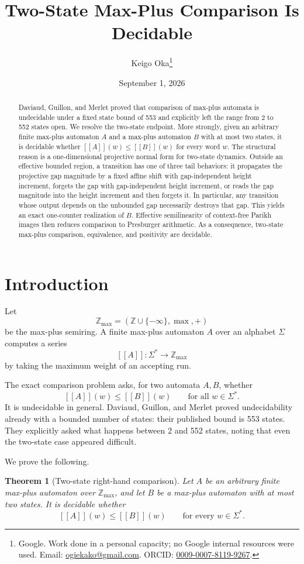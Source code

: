 \documentclass[11pt]{article}
\title{Two-State Max-Plus Comparison Is Decidable}
\author{Keigo Oka\thanks{Google. Work done in a personal capacity; no Google internal resources were used. Email: \href{mailto:ogiekako@gmail.com}{ogiekako@gmail.com}. ORCID: \href{https://orcid.org/0009-0007-8119-9267}{0009-0007-8119-9267}.}}
\date{September 1, 2026}
\newtheorem{theorem}{Theorem}[section]
\newcommand{\Zmax}{\mathbb{Z}_{\max}}
\newcommand{\minf}{-\infty}
\newcommand{\eval}[1]{[\![#1]\!]}
\begin{document}
\maketitle

\begin{abstract}
Daviaud, Guillon, and Merlet proved that comparison of max-plus automata is undecidable under a fixed state bound of 553 and explicitly left the range from 2 to 552 states open. We resolve the two-state endpoint. More strongly, given an arbitrary finite max-plus automaton $A$ and a max-plus automaton $B$ with at most two states, it is decidable whether $\eval{A}(w)\leq \eval{B}(w)$ for every word $w$. The structural reason is a one-dimensional projective normal form for two-state dynamics. Outside an effective bounded region, a transition has one of three tail behaviors: it propagates the projective gap magnitude by a fixed affine shift with gap-independent height increment, forgets the gap with gap-independent height increment, or reads the gap magnitude into the height increment and then forgets it. In particular, any transition whose output depends on the unbounded gap necessarily destroys that gap. This yields an exact one-counter realization of $B$. Effective semilinearity of context-free Parikh images then reduces comparison to Presburger arithmetic. As a consequence, two-state max-plus comparison, equivalence, and positivity are decidable.
\end{abstract}

\section{Introduction}

Let
\[
\Zmax=(\mathbb Z\cup\{\minf\},\max,+)
\]
be the max-plus semiring. A finite max-plus automaton $A$ over an alphabet $\Sigma$ computes a series
\[
\eval{A}:\Sigma^*\longrightarrow \Zmax
\]
by taking the maximum weight of an accepting run.

The exact comparison problem asks, for two automata $A,B$, whether
\[
\eval{A}(w)\leq \eval{B}(w)\qquad\text{for all }w\in\Sigma^*.
\]
It is undecidable in general. Daviaud, Guillon, and Merlet \cite{DGM2017} proved undecidability already with a bounded number of states: their published bound is 553 states. They explicitly asked what happens between 2 and 552 states, noting that even the two-state case appeared difficult.

We prove the following.

\begin{theorem}[Two-state right-hand comparison]\label{thm:main}
Let $A$ be an arbitrary finite max-plus automaton over $\Zmax$, and let $B$ be a max-plus automaton with at most two states. It is decidable whether
\[
\eval{A}(w)\leq \eval{B}(w)
\qquad\text{for every }w\in\Sigma^*.
\]
\end{theorem}
\end{document}
